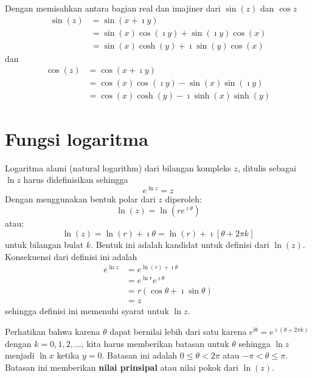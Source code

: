 Dengan memisahkan antara bagian real dan imajiner dari $\sin(z)$ dan
$\cos z$
\begin{align*}
\sin(z) & =\sin\left(x + \imath y\right) \\
 & = \sin(x) \cos(\imath y) + \sin(\imath y) \cos(x) \\
 & = \sin(x) \cosh(y) + \imath \sin(y)\cos(x)
\end{align*}
dan
\begin{align*}
\cos(z) & = \cos(x + \imath y) \\
 & = \cos(x)\cos(\imath y) - \sin(x) \sin(\imath y) \\
 & = \cos(x)\cosh(y) - \imath \sinh(x) \sinh(y)
\end{align*}



\section{Fungsi logaritma}

Logaritma alami (natural logarithm) dari bilangan kompleks $z$, ditulis
sebagai $\ln z$ harus didefinisikan sehingga
\[
e^{\ln z}=z
\]
Dengan menggunakan bentuk polar dari $z$ diperoleh:
\begin{equation}
\ln(z) = \ln \left(r e^{\imath \theta} \right)
\end{equation}
atau:
\begin{equation}
\ln(z) = \ln(r) + \imath \theta = \ln(r) + \imath\left[\theta + 2\pi k \right]
\label{eq:log-natural}
\end{equation}
untuk bilangan bulat $k$.
Bentuk ini adalah kandidat untuk definisi dari $\ln(z)$. Konsekuensi
dari definisi ini adalah
\begin{align*}
e^{\ln z} & =e^{\ln(r) + \imath \theta}\\
 & = e^{\ln r}e^{\imath \theta}\\
 & = r\left(\cos\theta+\imath \sin\theta\right)\\
 & = z
\end{align*}
sehingga definisi ini memenuhi syarat untuk $\ln z$.

Perhatikan bahwa karena $\theta$ dapat bernilai lebih dari satu karena
$e^{\mathrm{i\theta}} = e^{\imath (\theta + 2\pi k)}$ dengan $k=0,1,2,\ldots$,
kita harus memberikan batasan untuk $\theta$ sehingga $\ln z$
menjadi $\ln x$ ketika $y=0$. Batasan ini adalah $0\leq\theta<2\pi$
atau $-\pi < \theta \leq \pi$. Batasan ini memberikan \textbf{nilai prinsipal}
atau nilai pokok dari $\ln(z)$.


